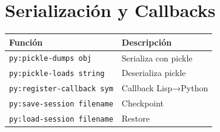 \section*{Serialización y Callbacks}

\begin{center}
\begin{tabular}{ll}
\toprule
\textbf{Función} & \textbf{Descripción} \\
\midrule
\texttt{py:pickle-dumps obj} & Serializa con pickle \\
\texttt{py:pickle-loads string} & Deserializa pickle \\
\texttt{py:register-callback sym} & Callback Lisp→Python \\
\texttt{py:save-session filename} & Checkpoint \\
\texttt{py:load-session filename} & Restore \\
\bottomrule
\end{tabular}
\end{center}


